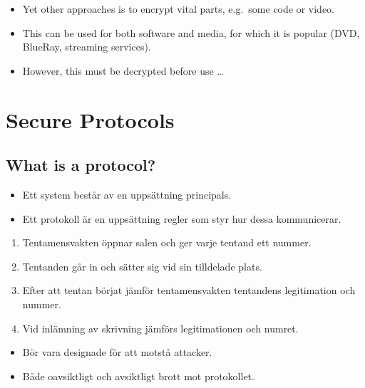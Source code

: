 \documentclass{beamer}
\begin{document}
\begin{frame}{\insertsubsectionhead}
  \begin{itemize}
    \item Yet other approaches is to encrypt vital parts, e.g.\ some code or 
      video.

    \item This can be used for both software and media, for which it is popular 
      (DVD, BlueRay, streaming services).

    \item However, this must be decrypted before use \dots
  \end{itemize}
\end{frame}


\section{Secure Protocols}

\subsection{What is a protocol?}

\begin{frame}{\insertsubsectionhead}
  \begin{itemize}
    \item Ett system består av en uppsättning principals.
    \item Ett protokoll är en uppsättning regler som styr hur dessa 
      kommunicerar.
  \end{itemize}
  \begin{example}
    \begin{enumerate}
      \item Tentamensvakten öppnar salen och ger varje tentand ett nummer.
      \item Tentanden går in och sätter sig vid sin tilldelade plats.
      \item Efter att tentan börjat jämför tentamensvakten tentandens 
        legitimation och nummer.
      \item Vid inlämning av skrivning jämförs legitimationen och numret.
    \end{enumerate}
  \end{example}
\end{frame}

\begin{frame}{\insertsubsectionhead}
  \begin{itemize}
    \item Bör vara designade för att motstå attacker.
    \item Både oavsiktligt och avsiktligt brott mot protokollet.
  \end{itemize}
\end{frame}
\end{document}
